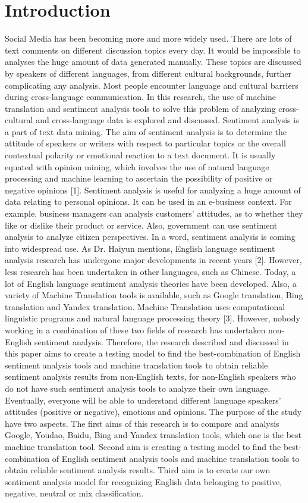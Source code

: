 \documentclass[conference,compsoc]{IEEEtran}
\begin{document}
\section{Introduction}
Social Media has been becoming more and more widely used. There are lots of text comments on different discussion topics every day. It would be impossible to analyses the huge amount of data generated manually. These topics are discussed by speakers of different languages, from different cultural backgrounds, further complicating any analysis. Most people encounter language and cultural barriers during cross-language communication.
In this research, the use of machine translation and sentiment analysis tools to solve this problem of analyzing cross-cultural and cross-language data is explored and discussed. Sentiment analysis is a part of text data mining. The aim of sentiment analysis is to determine the attitude of speakers or writers with respect to particular topics or the overall contextual polarity or emotional reaction to a text document. It is usually equated with opinion mining, which involves the use of natural language processing and machine learning to ascertain the possibility of positive or negative opinions [1]. Sentiment analysis is useful for analyzing a huge amount of data relating to personal opinions. It can be used in an e-business context. For example, business managers can analysis customers’ attitudes, as to whether they like or dislike their product or service. Also, government can use sentiment analysis to analyze citizen perspectives.
In a word, sentiment analysis is coming into widespread use. As Dr. Haiyun
mentions, English language sentiment analysis research has undergone major
developments in recent years [2]. However, less research has been undertaken in
other languages, such as Chinese. Today, a lot of English language sentiment
analysis theories have been developed. Also, a variety of Machine Translation
tools is available, such as Google translation, Bing translation and Yandex
translation. Machine Translation uses computational linguistic programs and
natural language processing theory [3]. However, nobody working in a combination
of these two fields of research has undertaken non-English sentiment analysis.
Therefore, the research described and discussed in this paper aims to create a
testing model to find the best-combination of English sentiment analysis tools
and machine translation tools to obtain reliable sentiment analysis results from
non-English texts, for non-English speakers who do not have such sentiment
analysis tools to analyze their own language. Eventually, everyone will be able
to understand different language speakers’ attitudes (positive or negative),
emotions and opinions. The purpose of the study have two aspects. The first aims
of this research is to compare and analysis Google, Youdao, Baidu, Bing and
Yandex translation tools, which one is the best machine translation tool. Second
aim is creating a testing model to find the best-combination of English
sentiment analysis tools and machine translation tools to obtain reliable
sentiment analysis results. Third aim is to create our own sentiment analysis
model for recognizing English data belonging to positive, negative, neutral or
mix classification.
\end{document}
